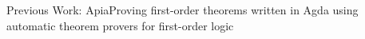 \documentclass[xetex, hyperref={pdfpagelabels=false}]{beamer}
\begin{document}
\begin{frame}[fragile]{Previous Work: Apia}{Proving first-order theorems written in Agda using automatic theorem provers for first-order logic}
\end{frame}
\end{document}
